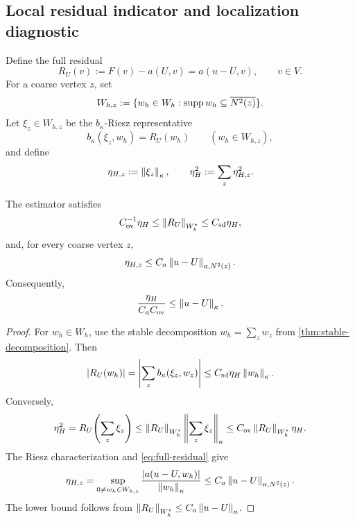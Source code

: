 \subsection{Local residual indicator and localization diagnostic}
\label{sec:local-diagnostics}

Define the full residual
\begin{equation}
\label{eq:full-residual}
  R_U(v):=F(v)-a(U,v)=a(u-U,v),
  \qquad v\in V.
\end{equation}
For a coarse vertex $z$, set
\begin{equation}
\label{eq:Whz}
  W_{h,z}:=\{w_h\in W_h:\operatorname{supp} w_h\subseteq\overline{N^2(z)}\}.
\end{equation}
Let $\xi_z\in W_{h,z}$ be the $b_\kappa$-Riesz representative
\begin{equation}
\label{eq:local-residual-riesz}
  b_\kappa(\xi_z,w_h)=R_U(w_h)
  \qquad(w_h\in W_{h,z}),
\end{equation}
and define
\begin{equation}
\label{eq:etaH}
  \eta_{H,z}:=\left\lVert \xi_z\right\rVert_\kappa,
  \qquad
  \eta_H^2:=\sum_z\eta_{H,z}^2.
\end{equation}

\begin{theorem}
\label{thm:residual-localization}
The estimator satisfies
\begin{equation}
\label{eq:residual-equivalence}
  C_{\mathrm{ov}}^{-1}\eta_H
  \leq\left\lVert R_U\right\rVert_{W_h^\star}
  \leq C_{\mathrm{sd}}\eta_H,
\end{equation}
and, for every coarse vertex $z$,
\begin{equation}
\label{eq:local-efficiency}
  \eta_{H,z}
  \leq C_a\left\lVert u-U\right\rVert_{\kappa,N^2(z)}.
\end{equation}
Consequently,
\begin{equation}
\label{eq:exact-lower-bound}
  \frac{\eta_H}{C_aC_{\mathrm{ov}}}
  \leq\left\lVert u-U\right\rVert_\kappa.
\end{equation}
\end{theorem}

\begin{proof}
For $w_h\in W_h$, use the stable decomposition
$w_h=\sum_zw_z$ from \cref{thm:stable-decomposition}.  Then
\[
  |R_U(w_h)|
  =\left|\sum_zb_\kappa(\xi_z,w_z)\right|
  \leq C_{\mathrm{sd}}\eta_H\left\lVert w_h\right\rVert_\kappa.
\]
Conversely,
\[
  \eta_H^2
  =R_U\!\left(\sum_z\xi_z\right)
  \leq\left\lVert R_U\right\rVert_{W_h^\star}
       \left\lVert \sum_z\xi_z\right\rVert_\kappa
  \leq C_{\mathrm{ov}}\left\lVert R_U\right\rVert_{W_h^\star}\eta_H.
\]
The Riesz characterization and \eqref{eq:full-residual} give
\[
  \eta_{H,z}
  =\sup_{0\neq w_h\in W_{h,z}}
   \frac{|a(u-U,w_h)|}{\left\lVert w_h\right\rVert_\kappa}
  \leq C_a\left\lVert u-U\right\rVert_{\kappa,N^2(z)}.
\]
The lower bound follows from
$\left\lVert R_U\right\rVert_{W_h^\star}\leq C_a\left\lVert u-U\right\rVert_\kappa$.
\end{proof}

